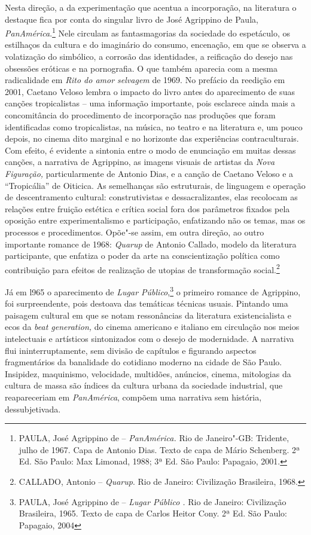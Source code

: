 Nesta direção, a da experimentação que acentua a incorporação, na
literatura o destaque fica por conta do singular livro de José Agrippino
de Paula, \emph{PanAmérica}.\footnote{\textsc{PAULA}, José Agrippino de --
  \emph{PanAmérica.} Rio de Janeiro"-\textsc{GB}: Tridente, julho de 1967. Capa de
  Antonio Dias. Texto de capa de Mário Schenberg. 2ª Ed. São Paulo: Max
  Limonad, 1988; 3ª Ed. São Paulo: Papagaio, 2001.} Nele circulam as
fantasmagorias da sociedade do espetáculo, os estilhaços da cultura e do
imaginário do consumo, encenação, em que se observa a volatização do
simbólico, a corrosão das identidades, a reificação do desejo nas
obsessões eróticas e na pornografia. O que também aparecia com a mesma
radicalidade em \emph{Rito do amor selvagem} de 1969. No prefácio da
reedição em 2001, Caetano Veloso lembra o impacto do livro antes do
aparecimento de suas canções tropicalistas -- uma informação importante,
pois esclarece ainda mais a concomitância do procedimento de
incorporação nas produções que foram identificadas como tropicalistas,
na música, no teatro e na literatura e, um pouco depois, no cinema dito
marginal e no horizonte das experiências contraculturais. Com efeito, é
evidente a sintonia entre o modo de enunciação em muitas dessas canções,
a narrativa de Agrippino, as imagens visuais de artistas da \emph{Nova
Figuração,} particularmente de Antonio Dias, e a canção de Caetano
Veloso e a ``Tropicália'' de Oiticica. As semelhanças são estruturais,
de linguagem e operação de descentramento cultural: construtivistas e
dessacralizantes, elas recolocam as relações entre fruição estética e
crítica social fora dos parâmetros fixados pela oposição entre
experimentalismo e participação, enfatizando não os temas, mas os
processos e procedimentos. Opõe"-se assim, em outra direção, ao outro
importante romance de 1968: \emph{Quarup} de Antonio Callado, modelo da
literatura participante, que enfatiza o poder da arte na conscientização
política como contribuição para efeitos de realização de utopias de
transformação social.\footnote{\textsc{CALLADO}, Antonio -- \emph{Quarup}. Rio de
  Janeiro: Civilização Brasileira, 1968.}

Já em l965 o aparecimento de \emph{Lugar Público},\footnote{\textsc{PAULA}, José
  Agrippino de -- \emph{Lugar Público .} Rio de Janeiro: Civilização
  Brasileira, 1965. Texto de capa de Carlos Heitor Cony. 2ª Ed. São
  Paulo: Papagaio, 2004} o primeiro romance de Agrippino, foi
surpreendente, pois destoava das temáticas técnicas usuais. Pintando uma
paisagem cultural em que se notam ressonâncias da literatura
existencialista e ecos da \emph{beat generation,} do cinema americano e
italiano em circulação nos meios intelectuais e artísticos sintonizados
com o desejo de modernidade. A narrativa flui ininterruptamente, sem
divisão de capítulos e figurando aspectos fragmentários da banalidade do
cotidiano moderno na cidade de São Paulo. Insipidez, maquinismo,
velocidade, multidões, anúncios, cinema, mitologias da cultura de massa
são índices da cultura urbana da sociedade industrial, que reapareceriam
em \emph{PanAmérica}, compõem uma narrativa sem história,
dessubjetivada.

